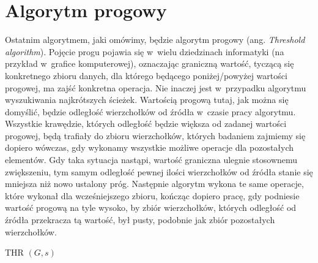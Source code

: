 \section{Algorytm progowy}

Ostatnim algorytmem, jaki omówimy, będzie algorytm progowy (ang. \textit{Threshold algorithm}). Pojęcie progu pojawia się w~wielu dziedzinach informatyki (na przykład w~grafice komputerowej), oznaczając graniczną wartość, tyczącą się konkretnego zbioru danych, dla którego będącego poniżej/powyżej wartości progowej, ma zajść konkretna operacja. Nie inaczej jest w~przypadku algorytmu wyszukiwania najkrótszych ścieżek. Wartością progową tutaj, jak można się domyślić, będzie odległość wierzchołków od źródła w~czasie pracy algorytmu. Wszystkie krawędzie, których odległość będzie większa od zadanej wartości progowej, będą trafiały do zbioru wierzchołków, których badaniem zajmiemy się dopiero wówczas, gdy wykonamy wszystkie możliwe operacje dla pozostałych elementów. Gdy taka sytuacja nastąpi, wartość graniczna ulegnie stosownemu zwiększeniu, tym samym odległość pewnej ilości wierzchołków od źródła stanie się mniejsza niż nowo ustalony próg. Następnie algorytm wykona te same operacje, które wykonał dla wcześniejszego zbioru, kończąc dopiero pracę, gdy podniesie wartość progową na tyle wysoko, by zbiór wierzchołków, których odległość od źródła przekracza tą wartość, był pusty, podobnie jak zbiór pozostałych wierzchołków.

\begin{algorithm}[!htbp]
\DontPrintSemicolon
{}
\caption{ THR $\left( G, s \right)$\label{alg:ThresholdAlgorith}}
\end{algorithm}


